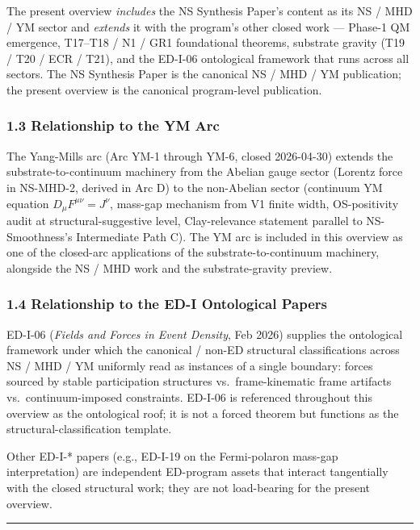 \documentclass[
]{article}
\begin{document}
The present overview \emph{includes} the NS Synthesis Paper's content as
its NS / MHD / YM sector and \emph{extends} it with the program's other
closed work --- Phase-1 QM emergence, T17--T18 / N1 / GR1 foundational
theorems, substrate gravity (T19 / T20 / ECR / T21), and the ED-I-06
ontological framework that runs across all sectors. The NS Synthesis
Paper is the canonical NS / MHD / YM publication; the present overview
is the canonical program-level publication.

\subsubsection{1.3 Relationship to the YM
Arc}\label{relationship-to-the-ym-arc}

The Yang-Mills arc (Arc YM-1 through YM-6, closed 2026-04-30) extends
the substrate-to-continuum machinery from the Abelian gauge sector
(Lorentz force in NS-MHD-2, derived in Arc D) to the non-Abelian sector
(continuum YM equation \(D_\mu F^{\mu\nu} = J^\nu\), mass-gap mechanism
from V1 finite width, OS-positivity audit at structural-suggestive
level, Clay-relevance statement parallel to NS-Smoothness's Intermediate
Path C). The YM arc is included in this overview as one of the
closed-arc applications of the substrate-to-continuum machinery,
alongside the NS / MHD work and the substrate-gravity preview.

\subsubsection{1.4 Relationship to the ED-I Ontological
Papers}\label{relationship-to-the-ed-i-ontological-papers}

ED-I-06 (\emph{Fields and Forces in Event Density}, Feb 2026) supplies
the ontological framework under which the canonical / non-ED structural
classifications across NS / MHD / YM uniformly read as instances of a
single boundary: forces sourced by stable participation structures
vs.~frame-kinematic frame artifacts vs.~continuum-imposed constraints.
ED-I-06 is referenced throughout this overview as the ontological roof;
it is not a forced theorem but functions as the
structural-classification template.

Other ED-I-* papers (e.g., ED-I-19 on the Fermi-polaron mass-gap
interpretation) are independent ED-program assets that interact
tangentially with the closed structural work; they are not load-bearing
for the present overview.

\begin{center}\rule{0.5\linewidth}{0.5pt}\end{center}
\end{document}
